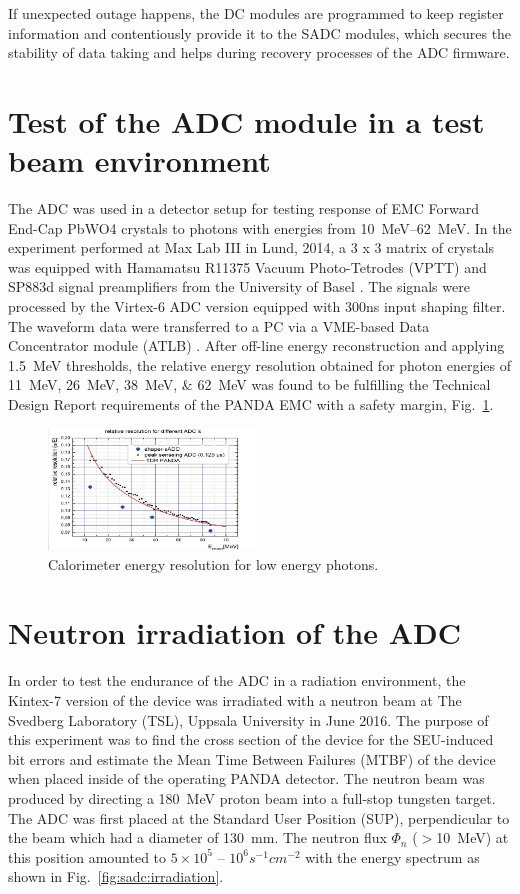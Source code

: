 \documentclass[12pt,a4paper, twocolumn]{article}
\newcommand{\Reffig}[1]{Fig.~\ref{#1}}
\begin{document}
 If unexpected outage happens, the DC modules are programmed to keep register information and contentiously provide it to the SADC modules, which secures the stability of data taking and helps during recovery processes of the ADC firmware.

\section{Test of the ADC module in a test beam environment}
The ADC was used in a detector setup for testing response of EMC Forward End-Cap PbWO4 crystals to photons with energies from \SIrange{10}{62}{\mega\electronvolt}. In the experiment performed at Max Lab III in Lund, 2014, a 3 x 3 matrix of crystals was equipped with Hamamatsu R11375 Vacuum Photo-Tetrodes (VPTT) and SP883d signal preamplifiers from the University of Basel \cite{Keshelashvili_2015}. The signals were processed by the Virtex-6 ADC version equipped with 300ns input shaping filter. The waveform data were transferred to a PC via a VME-based Data Concentrator module (ATLB) \cite{Marciniewski}.
After off-line energy reconstruction and applying \SI{1.5}{\mega\electronvolt} thresholds, the relative energy resolution obtained for photon energies of \SIlist{11; 26; 38; 62}{\mega\electronvolt} was found to be fulfilling the Technical Design Report requirements of the PANDA EMC with a safety margin, \Reffig{fig:sadc:resolution}.

\begin{figure}[htb]
\includegraphics[width=0.49\textwidth ,trim={1 0 0 0}, clip]{fig/Figure3.png}
\caption{\label{fig:sadc:resolution}Calorimeter energy resolution for low energy photons.}
\end{figure}
\section{Neutron irradiation of the ADC}
In order to test the endurance of the ADC in a radiation environment, the Kintex-7 version of the device was irradiated with a neutron beam at The Svedberg Laboratory (TSL), Uppsala University in June 2016. The purpose of this experiment was to find the cross section of the device for the SEU-induced bit errors and estimate the Mean Time Between Failures (MTBF) of the device when placed inside of the operating PANDA detector.
The neutron beam was produced by directing a \SI{180}{\mega\electronvolt} proton beam into a full-stop tungsten target.
The ADC was first placed at the Standard User Position (SUP), perpendicular to the beam which had a diameter of \SI{130}{\milli\metre}. The neutron flux $\Phi_n$  ($>$\SI{10}{\mega\electronvolt}) at this position amounted to $5\times10^5$ -- $10^6 s^{-1}cm^{-2}$  with the energy spectrum as shown in \Reffig{fig:sadc:irradiation}.
\end{document}
